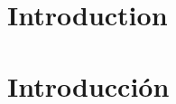 %

{
  \chapter{Introduction}
}
{
  \chapter{Introducción}
}
\label{cha:compendium-introduction}









